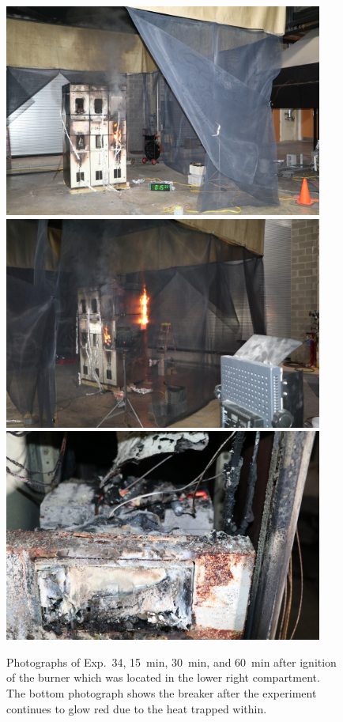 \documentclass[12pt]{article}
\begin{document}
\begin{figure}[p]
\centering
\includegraphics[height=2.75in]{../FIGURES/Test_34_15_min} \\
\includegraphics[height=2.75in]{../FIGURES/Test_34_30_min} \\
\includegraphics[height=2.75in]{../FIGURES/Test_34_60_min}
\caption[Photographs of Exp.~34]{Photographs of Exp.~34, 15~min, 30~min, and 60~min after ignition of the burner which was located in the lower right compartment. The bottom photograph shows the breaker after the experiment continues to glow red due to the heat trapped within.}
\label{fig:Test_34_photos}
\end{figure}
\end{document}

